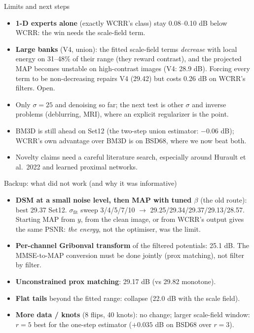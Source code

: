 \documentclass[10pt,aspectratio=169]{beamer}
\begin{document}
\begin{frame}{Limits and next steps}
\begin{itemize}
\item \textbf{1-D experts alone} (exactly WCRR's class) stay 0.08--0.10 dB below WCRR: the win
      needs the scale-field term.
\item \textbf{Large banks} (V4, union): the fitted scale-field terms \emph{decrease} with local energy
      on 31--48\% of their range (they reward contrast), and the projected MAP becomes unstable
      on high-contrast images (V4: 28.9 dB). Forcing every term to be non-decreasing repairs V4
      (29.42) but costs 0.26 dB on WCRR's filters. Open.
\item Only $\sigma=25$ and denoising so far; the next test is other $\sigma$ and inverse problems
      (deblurring, MRI), where an explicit regularizer is the point.
\item BM3D is still ahead on Set12 (the two-step union estimator: $-0.06$ dB); WCRR's own
      advantage over BM3D is on BSD68, where we now beat both.
\item Novelty claims need a careful literature search, especially around Hurault et al.\ 2022
      and learned proximal networks.
\end{itemize}
\end{frame}

\appendix
\begin{frame}{Backup: what did not work (and why it was informative)}
\small
\begin{itemize}
\item \textbf{DSM at a small noise level, then MAP with tuned $\beta$} (the old route): best 29.37 Set12.
      $\sigma_{\text{fit}}$ sweep 3/4/5/7/10 $\to$ 29.25/29.34/29.37/29.13/28.57. Starting MAP from $y$,
      from the clean image, or from WCRR's output gives the same PSNR: \emph{the energy}, not the
      optimiser, was the limit.
\item \textbf{Per-channel Gribonval transform} of the filtered potentials: 25.1 dB. The MMSE-to-MAP
      conversion must be done jointly (prox matching), not filter by filter.
\item \textbf{Unconstrained prox matching}: 29.17 dB (vs 29.82 monotone).
\item \textbf{Flat tails} beyond the fitted range: collapse (22.0 dB with the scale field).
\item \textbf{More data / knots} (8 flips, 40 knots): no change; larger scale-field window:
      $r=5$ best for the one-step estimator ($+0.035$ dB on BSD68 over $r=3$).
\end{itemize}
\end{frame}
\end{document}
